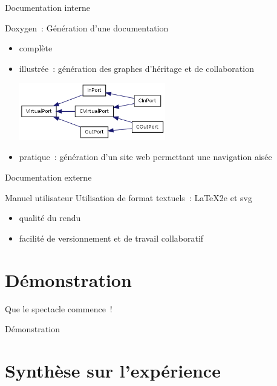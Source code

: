 \documentclass[frenchb]{beamer}
\begin{document}
\begin{frame}{Documentation interne}
    \begin{block}{Doxygen~: Génération d'une documentation}
            \begin{itemize}
                \item complète 
                \item illustrée~: génération des graphes d'héritage et de collaboration
                \begin{center}
                    \includegraphics[height=2.5cm]{../img/png/inheritVirtualPort}
                \end{center}
                \item pratique~: génération d'un site web permettant une navigation aisée
            \end{itemize}
     \end{block}
\end{frame}

\begin{frame}{Documentation externe}
     \begin{block}{Manuel utilisateur}
        Utilisation de format textuels~: \LaTeX2e{} et svg
        \begin{itemize}
            \item qualité du rendu
            \item facilité de versionnement et de travail collaboratif
        \end{itemize}
     \end{block}
\end{frame}

\section{Démonstration}

\begin{frame}{Que le spectacle commence~!}
    \begin{center}
        Démonstration
    \end{center}
\end{frame}

\section{Synthèse sur l’expérience}
\end{document}
